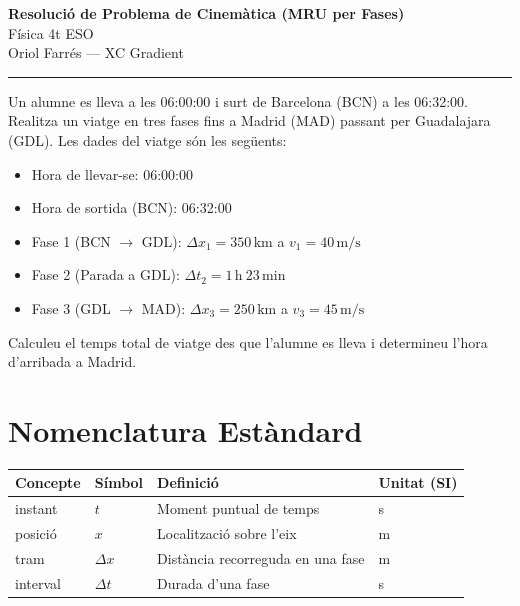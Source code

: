 \documentclass[12pt,a4paper]{article}
\begin{document}
\begin{center}
  {\Large\bfseries Resolució de Problema de Cinemàtica (MRU per Fases)}\\[0.4em]
  {\large Física 4t ESO}\\[0.2em]
  {\normalsize Oriol Farrés --- XC Gradient}
\end{center}
\vspace{0.5em}
\hrule
\vspace{1em}

\begin{tcolorbox}[title=Enunciat,colframe=blue!60!black,colback=blue!5,sharp corners=south]
Un alumne es lleva a les 06:00:00 i surt de Barcelona (BCN) a les 06:32:00. Realitza un viatge en tres fases fins a Madrid (MAD) passant per Guadalajara (GDL). Les dades del viatge són les següents:
\begin{itemize}
  \item Hora de llevar-se: 06:00:00
  \item Hora de sortida (BCN): 06:32:00
  \item Fase 1 (BCN $\to$ GDL): $\Delta x_1 = 350\,\text{km}$ a $v_1 = 40\,\text{m/s}$
  \item Fase 2 (Parada a GDL): $\Delta t_2 = 1\,\text{h}\ 23\,\text{min}$
  \item Fase 3 (GDL $\to$ MAD): $\Delta x_3 = 250\,\text{km}$ a $v_3 = 45\,\text{m/s}$
\end{itemize}
Calculeu el temps total de viatge des que l'alumne es lleva i determineu l'hora d'arribada a Madrid.
\end{tcolorbox}

\section{Nomenclatura Estàndard}

\begin{table}[H]
\centering
\begin{tabularx}{\textwidth}{@{}>{\raggedright\arraybackslash}p{}>{\centering\arraybackslash}p{}>{\raggedright\arraybackslash}X>{\centering\arraybackslash}p{}@{}}
\toprule
Concepte & Símbol & Definició & Unitat (SI) \\
\midrule
instant & $t$ & Moment puntual de temps & s \\
posició & $x$ & Localització sobre l'eix & m \\
tram & $\Delta x$ & Distància recorreguda en una fase & m \\
interval & $\Delta t$ & Durada d'una fase & s \\
\bottomrule
\end{tabularx}
\end{table}
\end{document}
